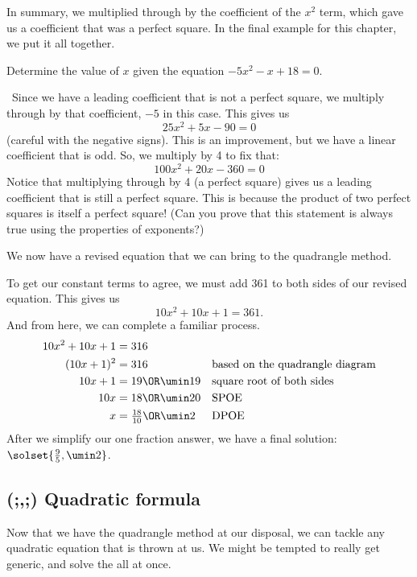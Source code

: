 In summary, we multiplied through by the coefficient of the $x^2$ term, which gave us a coefficient that was a perfect square. In the final example for this chapter, we put it all together.

\begin{boxedex}
Determine the value of $x$ given the equation $-5x^2-x+18=0$.

\exsoln\ Since we have a leading coefficient that is not a perfect square, we multiply through by that coefficient, $-5$ in this case. This gives us
\[25x^2+5x-90=0\]
(careful with the negative signs). This is an improvement, but we have a linear coefficient that is odd. So, we multiply by 4 to fix that:
\[100x^2 + 20x - 360=0\]
Notice that multiplying through by 4 (a perfect square) gives us a leading coefficient that is still a perfect square. This is because the product of two perfect squares is itself a perfect square! (Can you prove that this statement is always true using the properties of exponents?)

We now have a revised equation that we can bring to the quadrangle method.


To get our constant terms to agree, we must add 361 to both sides of our revised equation. This gives us
\[10x^2 + 10x + 1 = 361.\]
And from here, we can complete a familiar process.
\begin{align*}
10x^2 +10x + 1 &= 316
&&\text{}
\\
(10x+1)^2 &= 316
&&\text{based on the quadrangle diagram}
\\
10x+1 &= 19 \OR \umin19
&&\text{square root of both sides}
\\
10x &= 18 \OR \umin20
&&\text{SPOE}
\\
x &= \tfrac{18}{10} \OR \umin2
&&\text{DPOE}
\end{align*}
After we simplify our one fraction answer, we have a final solution: $\solset{\frac{9}{5}, \umin2}$.
\end{boxedex}

\subsection{(;,;) Quadratic formula}
\label{sec:quadformulapreview}

Now that we have the quadrangle method at our disposal, we can tackle any quadratic equation that is thrown at us. We might be tempted to really get generic, and solve the all at once.

